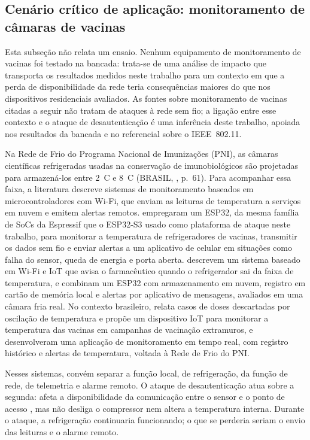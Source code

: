 \subsection{Cenário crítico de aplicação: monitoramento de câmaras de vacinas}
\label{subsec:cenario_vacinas}

Esta subseção não relata um ensaio. Nenhum equipamento de monitoramento de vacinas foi testado na bancada: trata-se de uma análise de impacto que transporta os resultados medidos neste trabalho para um contexto em que a perda de disponibilidade da rede teria consequências maiores do que nos dispositivos residenciais avaliados. As fontes sobre monitoramento de vacinas citadas a seguir não tratam de ataques à rede sem fio; a ligação entre esse contexto e o ataque de desautenticação é uma inferência deste trabalho, apoiada nos resultados da bancada e no referencial sobre o IEEE~802.11.

Na Rede de Frio do Programa Nacional de Imunizações (PNI), as câmaras científicas refrigeradas usadas na conservação de imunobiológicos são projetadas para armazená-los entre 2~\textdegree{}C e 8~\textdegree{}C (BRASIL, \citeyear{BrasilRedeFrio2025}, p.~61). Para acompanhar essa faixa, a literatura descreve sistemas de monitoramento baseados em microcontroladores com Wi-Fi, que enviam as leituras de temperatura a serviços em nuvem e emitem alertas remotos.  empregaram um ESP32, da mesma família de SoCs da Espressif que o ESP32-S3 usado como plataforma de ataque neste trabalho, para monitorar a temperatura de refrigeradores de vacinas, transmitir os dados sem fio e enviar alertas a um aplicativo de celular em situações como falha do sensor, queda de energia e porta aberta.  descrevem um sistema baseado em Wi-Fi e IoT que avisa o farmacêutico quando o refrigerador sai da faixa de temperatura, e  combinam um ESP32 com armazenamento em nuvem, registro em cartão de memória local e alertas por aplicativo de mensagens, avaliados em uma câmara fria real. No contexto brasileiro,  relata casos de doses descartadas por oscilação de temperatura e propõe um dispositivo IoT para monitorar a temperatura das vacinas em campanhas de vacinação extramuros, e  desenvolveram uma aplicação de monitoramento em tempo real, com registro histórico e alertas de temperatura, voltada à Rede de Frio do PNI.

Nesses sistemas, convém separar a função local, de refrigeração, da função de rede, de telemetria e alarme remoto. O ataque de desautenticação atua sobre a segunda: afeta a disponibilidade da comunicação entre o sensor e o ponto de acesso \cite{KohliosHayajneh2018}, mas não desliga o compressor nem altera a temperatura interna. Durante o ataque, a refrigeração continuaria funcionando; o que se perderia seriam o envio das leituras e o alarme remoto.

